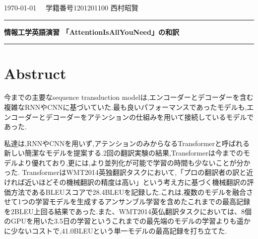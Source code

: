 \documentclass{jarticle}     %
\begin{document}
  \noindent
  \onecolumn
  \hspace{1em}

  \today
  \hfill
  \ \  学籍番号1201201100 西村昭賢 

  \vspace{2mm}
  \hrule
  \begin{center}
  {\Large \bf 情報工学英語演習 「{\rm AttentionIsAllYouNeed}」の和訳}
  \end{center}
  \hrule
  \vspace{3mm}

\section*{Abstruct}
今までの主要なsequence transduction modelは,エンコーダーとデコーダーを含む
複雑なRNNやCNNに基づいていた.最も良いパフォーマンスであったモデルも,エンコーダーとデコーダーをアテンションの仕組みを用いて接続しているモデルであった.\par
私達は,RNNやCNNを用いず,アテンションのみからなるTransformerと呼ばれる新しい簡潔なモデルを提案する.2回の翻訳実験の結果,Transformerは今までのモデルより優れており,更には,より並列化が可能で学習の時間も少ないことが分かった.
TransformerはWMT2014英独翻訳タスクにおいて,「プロの翻訳者の訳と近ければ近いほどその機械翻訳の精度は高い」という考え方に基づく機械翻訳の評価方法であるBLEUスコアで28.4BLEUを記録した.これは,複数のモデルを融合させて1つの学習モデルを生成するアンサンブル学習を含めたこれまでの最高記録を2BLEU上回る結果であった.また、WMT2014英仏翻訳タスクにおいては、8個のGPUを用いた3.5日の学習というこれまでの最先端のモデルの学習よりも遥かに少ないコストで,41.0BLEUという単一モデルの最高記録を打ち立てた.

\end{document}
